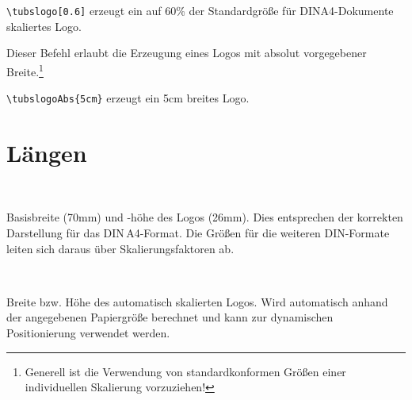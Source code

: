 \begin{example}
\lstinline!\tubslogo[0.6]! erzeugt ein auf 60\% der 
Standardgröße für DINA4-Dokumente skaliertes Logo.
\end{example}


\begin{Declaration}
\end{Declaration}\label{cmd:tubslogo}
Dieser Befehl erlaubt die Erzeugung eines Logos mit absolut vorgegebener
Breite.\footnote{Generell ist die Verwendung von standardkonformen Größen
einer individuellen Skalierung vorzuziehen!}

\begin{example}
  \lstinline!\tubslogoAbs{5cm}! erzeugt ein 5cm breites Logo.
\end{example}


\section{Längen}

\begin{Declaration}
  \\
\end{Declaration}
Basisbreite (70mm) und -höhe des Logos (26mm).
Dies entsprechen der korrekten Darstellung für das \mbox{DIN\,A4}-Format.
Die Größen für die weiteren DIN-Formate leiten sich daraus über
Skalierungsfaktoren ab.

\begin{Declaration}
  \\
\end{Declaration}
Breite bzw. Höhe des automatisch skalierten Logos.
Wird automatisch anhand der angegebenen Papiergröße berechnet und
kann zur dynamischen Positionierung verwendet werden.
